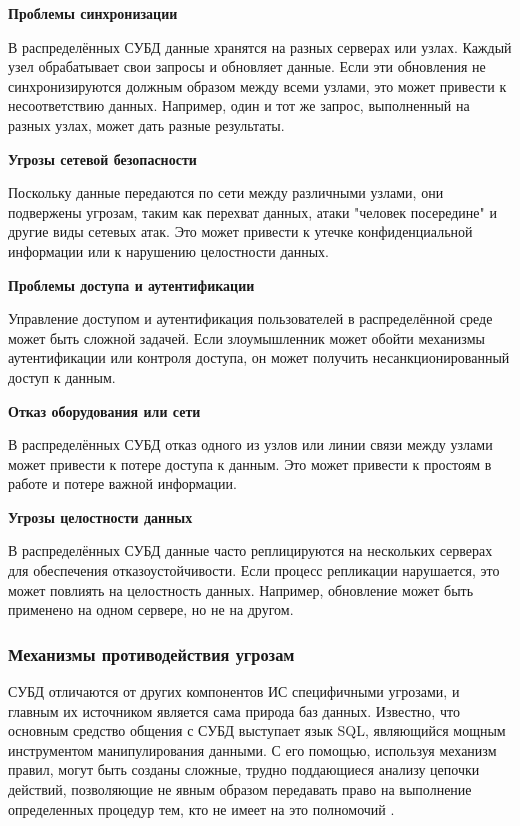 \textbf{Проблемы синхронизации}

В распределённых СУБД данные хранятся на разных серверах или узлах. Каждый узел обрабатывает свои запросы и обновляет данные. Если эти обновления не синхронизируются должным образом между всеми узлами, это может привести к несоответствию данных. Например, один и тот же запрос, выполненный на разных узлах, может дать разные результаты.

\textbf{Угрозы сетевой безопасности}

Поскольку данные передаются по сети между различными узлами, они подвержены угрозам, таким как перехват данных, атаки "человек посередине" и другие виды сетевых атак. Это может привести к утечке конфиденциальной информации или к нарушению целостности данных.

\textbf{Проблемы доступа и аутентификации}

Управление доступом и аутентификация пользователей в распределённой среде может быть сложной задачей. Если злоумышленник может обойти механизмы аутентификации или контроля доступа, он может получить несанкционированный доступ к данным.

\textbf{Отказ оборудования или сети}

В распределённых СУБД отказ одного из узлов или линии связи между узлами может привести к потере доступа к данным. Это может привести к простоям в работе и потере важной информации.

\textbf{Угрозы целостности данных}

В распределённых СУБД данные часто реплицируются на нескольких серверах для обеспечения отказоустойчивости. Если процесс репликации нарушается, это может повлиять на целостность данных. Например, обновление может быть применено на одном сервере, но не на другом.

\subsubsection{Механизмы противодействия угрозам}
СУБД отличаются от других компонентов ИС специфичными угрозами, и главным их источником является
сама природа баз данных. Известно, что основным средство общения с СУБД выступает язык SQL,
являющийся мощным инструментом манипулирования данными. С его помощью, используя механизм правил, могут
быть созданы сложные, трудно поддающиеся анализу цепочки действий, позволяющие не явным образом передавать
право на выполнение определенных процедур тем, кто не имеет на это полномочий \autocite{DistrDBThreats}.

